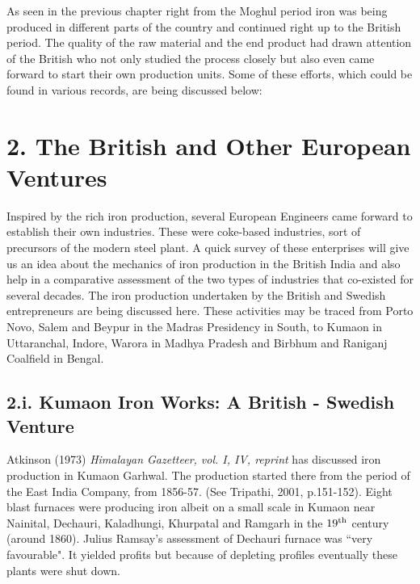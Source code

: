 As seen in the previous chapter right from the Moghul period iron was being produced in different parts of the country and continued right up to the British period. The quality of the raw material and the end product had drawn attention of the British who not only studied the process closely but also even came forward to start their own production units. Some of these efforts, which could be found in various records, are being discussed below:

\vspace{-.3cm}

\section*{2.  The British and Other European Ventures}\label{chapter6-section-4a}

\vspace{-.2cm}

Inspired by the rich iron production, several European Engineers came forward to establish their own industries. These were coke-based industries, sort of precursors of the modern steel plant. A quick survey of these enterprises will give us an idea about the mechanics of iron production in the British India and also help in a comparative assessment of the two types of industries that co-existed for several decades. The iron production undertaken by the British and Swedish entrepreneurs are being discussed here. These activities may be traced from Porto Novo, Salem and Beypur in the Madras Presidency in South, to Kumaon in Uttaranchal, Indore, Warora in Madhya Pradesh and Birbhum and Raniganj Coalfield in Bengal.

\vspace{-.3cm}

\subsection*{2.i. Kumaon Iron Works: A British - Swedish Venture}

\vspace{-.2cm}

Atkinson (1973) {\it Himalayan Gazetteer, vol. I, IV, reprint} has discussed iron production in Kumaon Garhwal.  The production started there from the period of the East India Company, from 1856-57. (See Tripathi, 2001, p.151-152). Eight blast furnaces were producing iron albeit on a small scale in Kumaon near Nainital, Dechauri, Kaladhungi, Khurpatal and Ramgarh in the $19^{\rm th}$ century (around 1860). Julius Ramsay's assessment of Dechauri furnace was ``very favourable". It yielded profits but because of depleting profiles eventually these plants were shut down.


